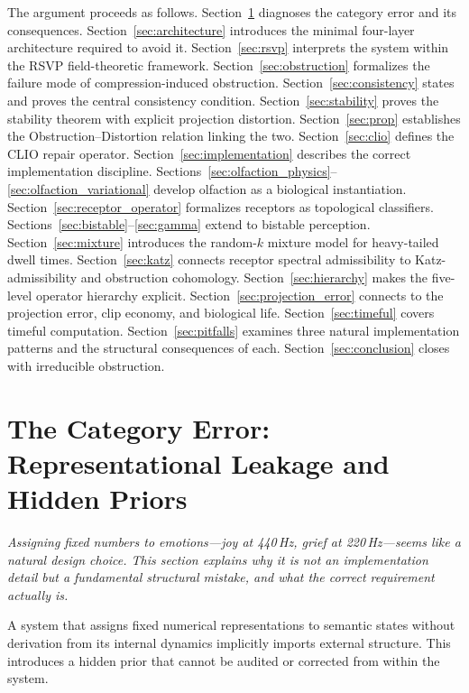 \documentclass[12pt,a4paper]{article}
\begin{document}
The argument proceeds as follows. Section~\ref{sec:category} diagnoses the category error and its consequences. Section~\ref{sec:architecture} introduces the minimal four-layer architecture required to avoid it. Section~\ref{sec:rsvp} interprets the system within the RSVP field-theoretic framework. Section~\ref{sec:obstruction} formalizes the failure mode of compression-induced obstruction. Section~\ref{sec:consistency} states and proves the central consistency condition. Section~\ref{sec:stability} proves the stability theorem with explicit projection distortion. Section~\ref{sec:prop} establishes the Obstruction--Distortion relation linking the two. Section~\ref{sec:clio} defines the CLIO repair operator. Section~\ref{sec:implementation} describes the correct implementation discipline. Sections~\ref{sec:olfaction_physics}--\ref{sec:olfaction_variational} develop olfaction as a biological instantiation. Section~\ref{sec:receptor_operator} formalizes receptors as topological classifiers. Sections~\ref{sec:bistable}--\ref{sec:gamma} extend to bistable perception. Section~\ref{sec:mixture} introduces the random-$k$ mixture model for heavy-tailed dwell times. Section~\ref{sec:katz} connects receptor spectral admissibility to Katz-admissibility and obstruction cohomology. Section~\ref{sec:hierarchy} makes the five-level operator hierarchy explicit. Section~\ref{sec:projection_error} connects to the projection error, clip economy, and biological life. Section~\ref{sec:timeful} covers timeful computation. Section~\ref{sec:pitfalls} examines three natural implementation patterns and the structural consequences of each. Section~\ref{sec:conclusion} closes with irreducible obstruction.

\section{The Category Error: Representational Leakage and Hidden Priors}
\label{sec:category}

\textit{Assigning fixed numbers to emotions---joy at 440\,Hz, grief at 220\,Hz---seems like a natural design choice. This section explains why it is not an implementation detail but a fundamental structural mistake, and what the correct requirement actually is.}

A system that assigns fixed numerical representations to semantic states without derivation from its internal dynamics implicitly imports external structure. This introduces a hidden prior that cannot be audited or corrected from within the system.
\end{document}
